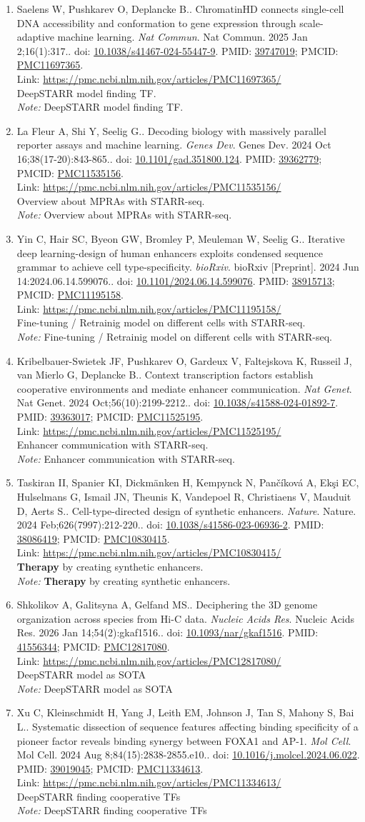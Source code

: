 \documentclass[12pt]{article}
\newcommand{\Pub}[9]{%
  \item #1. #2. \textit{#3}. #4. doi: \href{https://doi.org/#5}{#5}. PMID: \href{https://pubmed.ncbi.nlm.nih.gov/#6/}{#6}; PMCID: \href{https://www.ncbi.nlm.nih.gov/pmc/articles/#7/}{#7}. \\
  \noindent Link: \url{#8}\\
  \ifx#9\relax\else\\\textit{Note:} #9\fi
}
\begin{document}
\begin{enumerate}[leftmargin=*,label=\textbf{\arabic*.}]
\Pub{Saelens W, Pushkarev O, Deplancke B.}{ChromatinHD connects single-cell DNA accessibility and conformation to gene expression through scale-adaptive machine learning}{Nat Commun}{Nat Commun. 2025 Jan 2;16(1):317.}{10.1038/s41467-024-55447-9}{39747019}{PMC11697365}{https://pmc.ncbi.nlm.nih.gov/articles/PMC11697365/}{DeepSTARR model finding TF.}

\newpage

\Pub{La Fleur A, Shi Y, Seelig G.}{Decoding biology with massively parallel reporter assays and machine learning}{Genes Dev}{Genes Dev. 2024 Oct 16;38(17-20):843-865.}{10.1101/gad.351800.124}{39362779}{PMC11535156}{https://pmc.ncbi.nlm.nih.gov/articles/PMC11535156/}{Overview about MPRAs with STARR-seq.}

\Pub{Yin C, Hair SC, Byeon GW, Bromley P, Meuleman W, Seelig G.}{Iterative deep learning-design of human enhancers exploits condensed sequence grammar to achieve cell type-specificity}{bioRxiv}{bioRxiv [Preprint]. 2024 Jun 14:2024.06.14.599076.}{10.1101/2024.06.14.599076}{38915713}{PMC11195158}{https://pmc.ncbi.nlm.nih.gov/articles/PMC11195158/}{Fine-tuning / Retrainig model on different cells with STARR-seq.}

\Pub{Kribelbauer-Swietek JF, Pushkarev O, Gardeux V, Faltejskova K, Russeil J, van Mierlo G, Deplancke B.}{Context transcription factors establish cooperative environments and mediate enhancer communication}{Nat Genet}{Nat Genet. 2024 Oct;56(10):2199-2212.}{10.1038/s41588-024-01892-7}{39363017}{PMC11525195}{https://pmc.ncbi.nlm.nih.gov/articles/PMC11525195/}{Enhancer communication with STARR-seq.}

\Pub{Taskiran II, Spanier KI, Dickmänken H, Kempynck N, Pančíková A, Ekşi EC, Hulselmans G, Ismail JN, Theunis K, Vandepoel R, Christiaens V, Mauduit D, Aerts S.}{Cell-type-directed design of synthetic enhancers}{Nature}{Nature. 2024 Feb;626(7997):212-220.}{10.1038/s41586-023-06936-2}{38086419}{PMC10830415}{https://pmc.ncbi.nlm.nih.gov/articles/PMC10830415/}{\textbf{Therapy} by creating synthetic enhancers.}

\Pub{Shkolikov A, Galitsyna A, Gelfand MS.}{Deciphering the 3D genome organization across species from Hi-C data}{Nucleic Acids Res}{Nucleic Acids Res. 2026 Jan 14;54(2):gkaf1516.}{10.1093/nar/gkaf1516}{41556344}{PMC12817080}{https://pmc.ncbi.nlm.nih.gov/articles/PMC12817080/}{DeepSTARR model as SOTA}

\Pub{Xu C, Kleinschmidt H, Yang J, Leith EM, Johnson J, Tan S, Mahony S, Bai L.}{Systematic dissection of sequence features affecting binding specificity of a pioneer factor reveals binding synergy between FOXA1 and AP-1}{Mol Cell}{Mol Cell. 2024 Aug 8;84(15):2838-2855.e10.}{10.1016/j.molcel.2024.06.022}{39019045}{PMC11334613}{https://pmc.ncbi.nlm.nih.gov/articles/PMC11334613/}{DeepSTARR finding cooperative TFs}


\end{enumerate}
\end{document}
